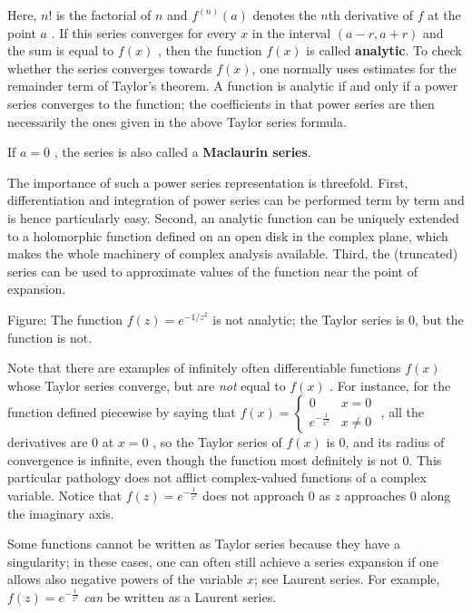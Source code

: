 Here, $n!$ is the factorial of $n$ and $f^{(n)}(a)$ denotes the $n$th derivative of $f$ at the point $a$ . If this series converges for every $x$ in the interval $(a-r,a+r)$ and the sum is equal to $f(x)$ , then the function $f(x)$ is called \textbf{analytic}. To check whether the series converges towards $f(x)$, one normally uses estimates for the remainder term of Taylor's theorem. A function is analytic if and only if a power series converges to the function; the coefficients in that power series are then necessarily the ones given in the above Taylor series formula.


If $a=0$ , the series is also called a \textbf{Maclaurin series}.


The importance of such a power series representation is threefold. First, differentiation and integration of power series can be performed term by term and is hence particularly easy. Second, an analytic function can be uniquely extended to a holomorphic function defined on an open disk in the complex plane, which makes the whole machinery of complex analysis available. Third, the (truncated) series can be used to approximate values of the function near the point of expansion.




Figure: The function $f(z) = e^{-1/z^2}$ is not analytic; the Taylor series is 0, but the function is not.


Note that there are examples of infinitely often differentiable functions $f(x)$ whose Taylor series converge, but are \textit{not} equal to $f(x)$ . For instance, for the function defined piecewise by saying that $f(x)=\begin{cases}0 & x=0 \\ e^{-\frac{1}{x^2}} & x\ne 0 \end{cases}$ , all the derivatives are 0 at $x=0$ , so the Taylor series of $f(x)$ is 0, and its radius of convergence is infinite, even though the function most definitely is not 0. This particular pathology does not afflict complex-valued functions of a complex variable. Notice that $f(z)=e^{-\frac{1}{z^2}}$ does not approach 0 as $z$ approaches 0 along the imaginary axis.


Some functions cannot be written as Taylor series because they have a singularity; in these cases, one can often still achieve a series expansion if one allows also negative powers of the variable $x$; see Laurent series. For example, $f(z)=e^{-\frac{1}{z^2}}$ \textit{can} be written as a Laurent series.


